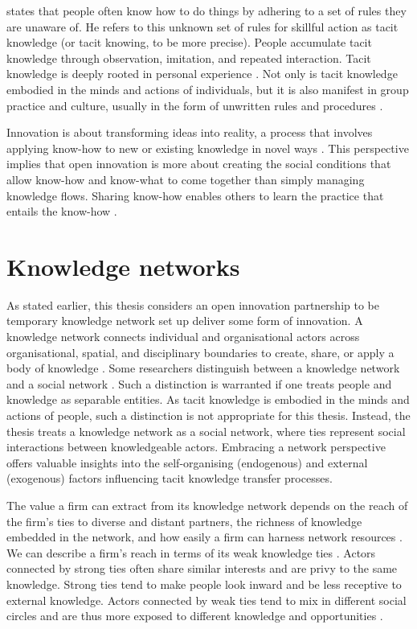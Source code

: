 \citet{polanyi1966tacit} states that people often know how to do things by adhering to a set of rules they are unaware of. He refers to this unknown set of rules for skillful action as tacit knowledge (or tacit knowing, to be more precise). People accumulate tacit knowledge through observation, imitation, and repeated interaction. Tacit knowledge is deeply rooted in personal experience \citep{nonaka1995knowledge}. Not only is tacit knowledge embodied in the minds and actions of individuals, but it is also manifest in group practice and culture, usually in the form of unwritten rules and procedures \citep{munoz2015tacit}. \medskip

Innovation is about transforming ideas into reality, a process that involves applying know-how to new or existing knowledge in novel ways \citep{van1986central,quintane2011innovation,garud2013perspectives}. This perspective implies that open innovation is more about creating the social conditions that allow know-how and know-what to come together than simply managing knowledge flows. Sharing know-how enables others to learn the practice that entails the know-how \citep{van1986central,goksel2016can}.

\section{Knowledge networks}

As stated earlier, this thesis considers an open innovation partnership to be temporary knowledge network set up deliver some form of innovation. A knowledge network connects individual and organisational actors across organisational, spatial, and disciplinary boundaries to create, share, or apply a body of knowledge \citep{pugh2013designing}. Some researchers distinguish between a knowledge network and a social network \citep[e.g.][]{yayavaram2008decomposability,wang2014knowledge,brennecke2017firm}. Such a distinction is warranted if one treats people and knowledge as separable entities. As tacit knowledge is embodied in the minds and actions of people, such a distinction is not appropriate for this thesis. Instead, the thesis treats a knowledge network as a social network, where ties represent social interactions between knowledgeable actors. Embracing a network perspective offers valuable insights into the self-organising (endogenous) and external (exogenous) factors influencing tacit knowledge transfer processes. \medskip

The value a firm can extract from its knowledge network depends on the reach of the firm's ties to diverse and distant partners, the richness of knowledge embedded in the network, and how easily a firm can harness network resources \citep{gulati2011networks}. We can describe a firm's reach in terms of its weak knowledge ties \citep{hansen1999search}. Actors connected by strong ties often share similar interests and are privy to the same knowledge. Strong ties tend to make people look inward and be less receptive to external knowledge. Actors connected by weak ties tend to mix in different social circles and are thus more exposed to different knowledge and opportunities \citep{granovetter1973strength}. \medskip

